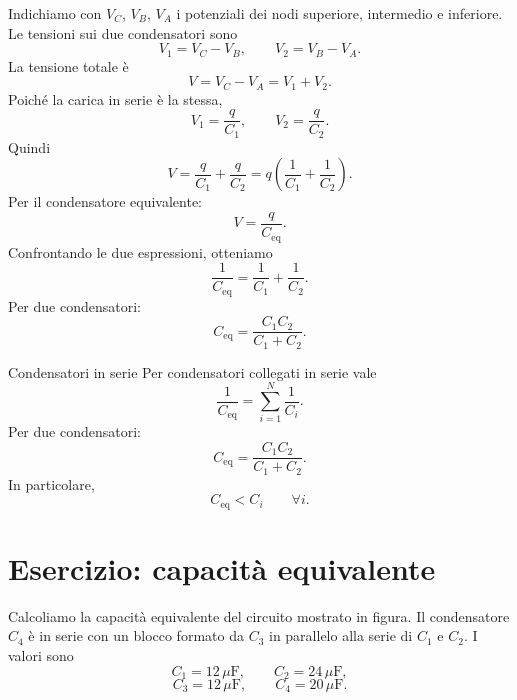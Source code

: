 \documentclass[a4paper]{article}
\begin{document}
Indichiamo con \(V_C\), \(V_B\), \(V_A\) i potenziali dei nodi superiore, intermedio e inferiore. Le tensioni sui due condensatori sono
\[
    V_1=V_C-V_B,
    \qquad
    V_2=V_B-V_A.
\]
La tensione totale è
\[
    V=V_C-V_A=V_1+V_2.
\]
Poiché la carica in serie è la stessa,
\[
    V_1=\frac{q}{C_1},
    \qquad
    V_2=\frac{q}{C_2}.
\]
Quindi
\[
    V=\frac{q}{C_1}+\frac{q}{C_2}=q\left(\frac{1}{C_1}+\frac{1}{C_2}\right).
\]
Per il condensatore equivalente:
\[
    V=\frac{q}{C_{\mathrm{eq}}}.
\]
Confrontando le due espressioni, otteniamo
\[
    \frac{1}{C_{\mathrm{eq}}}=\frac{1}{C_1}+\frac{1}{C_2}.
\]
Per due condensatori:
\[
    C_{\mathrm{eq}}=\frac{C_1C_2}{C_1+C_2}.
\]

\begin{snippetproposition}{Condensatori in serie}
    Per condensatori collegati in serie vale
    \[
        \frac{1}{C_{\mathrm{eq}}}=\sum_{i=1}^N\frac{1}{C_i}.
    \]
    Per due condensatori:
    \[
        C_{\mathrm{eq}}=\frac{C_1C_2}{C_1+C_2}.
    \]
    In particolare,
    \[
        C_{\mathrm{eq}}<C_i
        \qquad \forall i.
    \]
\end{snippetproposition}

\section{Esercizio: capacità equivalente}

Calcoliamo la capacità equivalente del circuito mostrato in figura. Il condensatore \(C_4\) è in serie con un blocco formato da \(C_3\) in parallelo alla serie di \(C_1\) e \(C_2\). I valori sono
\[
    C_1=12\,\mu\mathrm{F},
    \qquad
    C_2=24\,\mu\mathrm{F},
\]
\[
    C_3=12\,\mu\mathrm{F},
    \qquad
    C_4=20\,\mu\mathrm{F}.
\]

\begin{center}
\end{center}
\end{document}
